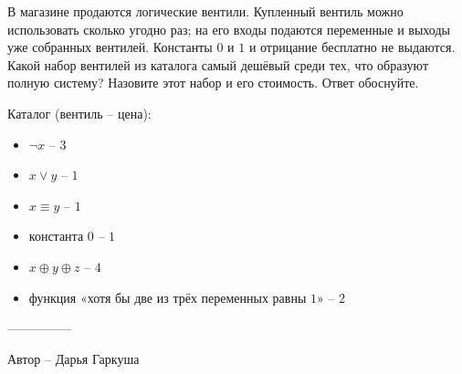 \question
В магазине продаются логические вентили. Купленный вентиль можно использовать сколько угодно раз; на его входы подаются переменные и выходы уже собранных вентилей. Константы $0$ и $1$ и отрицание бесплатно не выдаются. Какой набор вентилей из каталога самый дешёвый среди тех, что образуют полную систему? Назовите этот набор и его стоимость. Ответ обоснуйте.

Каталог (вентиль -- цена):
\begin{itemize}
    \item $\neg x$ -- $3$
    \item $x\vee y$ -- $1$
    \item $x\equiv y$ -- $1$
    \item константа $0$ -- $1$
    \item $x\oplus y\oplus z$ -- $4$
    \item функция «хотя бы две из трёх переменных равны $1$» -- $2$
\end{itemize}

---------------

Автор -- Дарья Гаркуша